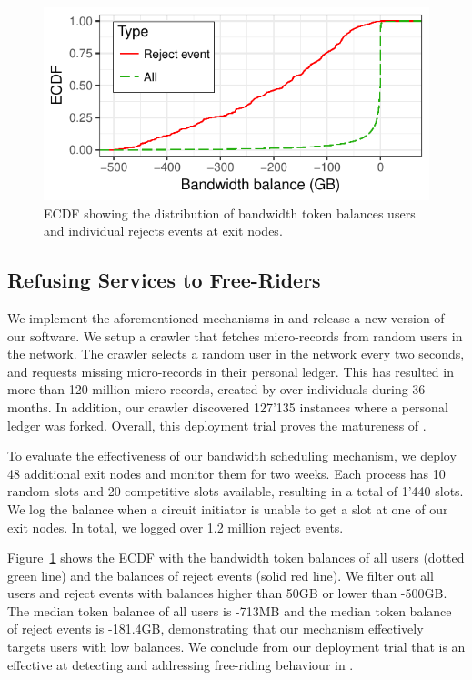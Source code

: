 \begin{figure}[b]
	\centering
	\includegraphics[width=\linewidth]{trustchain/assets/exit_node_rejects}
	\caption{ECDF showing the distribution of bandwidth token balances users and individual rejects events at exit nodes.}
	\label{fig:exit_node_rejects}
\end{figure}

\subsection{Refusing Services to Free-Riders}
We implement the aforementioned mechanisms in \Tribler{} and release a new version of our software.
We setup a crawler that fetches \ModelName{} micro-records from random users in the network.
The crawler selects a random user in the network every two seconds, and requests missing micro-records in their personal ledger.
This has resulted in more than 120 million micro-records, created by over \TrialUsers{} individuals during 36 months.
In addition, our crawler discovered 127'135 instances where a personal ledger was forked.
Overall, this deployment trial proves the matureness of \ModelName{}.

To evaluate the effectiveness of our bandwidth scheduling mechanism, we deploy 48 additional exit nodes and monitor them for two weeks.
Each process has 10 random slots and 20 competitive slots available, resulting in a total of 1'440 slots.
We log the balance when a circuit initiator is unable to get a slot at one of our exit nodes.
In total, we logged over 1.2 million reject events.

Figure~\ref{fig:exit_node_rejects} shows the ECDF with the bandwidth token balances of all users (dotted green line) and the balances of reject events (solid red line).
We filter out all users and reject events with balances higher than 50GB or lower than -500GB.
The median token balance of all users is -713MB and the median token balance of reject events is -181.4GB, demonstrating that our mechanism effectively targets users with low balances.
We conclude from our deployment trial that \ModelName{} is an effective at detecting and addressing free-riding behaviour in \Tribler{}.

